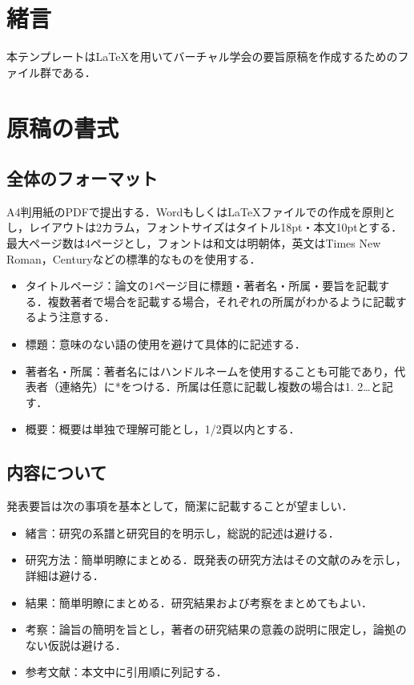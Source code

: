 \documentclass[10pt,a4paper,autodetect-engine,dvipdfmx]{jsarticle} %
\begin{document}
\begin{multicols}{2}

\section{緒言}

本テンプレートはLaTeXを用いてバーチャル学会の要旨原稿を作成するためのファイル群である．

\section{原稿の書式}

\subsection{全体のフォーマット}

A4判用紙のPDFで提出する．WordもしくはLaTeXファイルでの作成を原則とし，レイアウトは2カラム，フォントサイズはタイトル18pt・本文10ptとする．最大ページ数は4ページとし，フォントは和文は明朝体，英文はTimes New Roman，Centuryなどの標準的なものを使用する．

\begin{itemize}
\item タイトルページ：論文の1ページ目に標題・著者名・所属・要旨を記載する．複数著者で場合を記載する場合，それぞれの所属がわかるように記載するよう注意する．
\item 標題：意味のない語の使用を避けて具体的に記述する．
\item 著者名・所属：著者名にはハンドルネームを使用することも可能であり，代表者（連絡先）に*をつける．所属は任意に記載し複数の場合は1. 2…と記す．
\item 概要：概要は単独で理解可能とし，1/2頁以内とする．
\end{itemize}

\subsection{内容について}

発表要旨は次の事項を基本として，簡潔に記載することが望ましい．

\begin{itemize}
\item 緒言：研究の系譜と研究目的を明示し，総説的記述は避ける．
\item 研究方法：簡単明瞭にまとめる．既発表の研究方法はその文献のみを示し，詳細は避ける．
\item 結果：簡単明瞭にまとめる．研究結果および考察をまとめてもよい．
\item 考察：論旨の簡明を旨とし，著者の研究結果の意義の説明に限定し，論拠のない仮説は避ける．
\item 参考文献：本文中に引用順に列記する．
\end{itemize}


\end{multicols}
\end{document}
